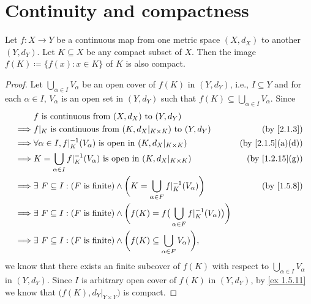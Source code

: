 \section{Continuity and compactness}\label{sec 2.3}

\begin{theorem}\label{2.3.1}
  Let \(f : X \to Y\) be a continuous map from one metric space \((X, d_X)\) to another \((Y, d_Y)\).
  Let \(K \subseteq X\) be any compact subset of \(X\).
  Then the image \(f(K) \coloneqq \{f(x) : x \in K\}\) of \(K\) is also compact.
\end{theorem}

\begin{proof}
  Let \(\bigcup_{\alpha \in I} V_\alpha\) be an open cover of \(f(K)\) in \((Y, d_Y)\), i.e., \(I \subseteq Y\) and for each \(\alpha \in I\), \(V_{\alpha}\) is an open set in \((Y, d_Y)\) such that \(f(K) \subseteq \bigcup_{\alpha \in I} V_\alpha\).
  Since
  \begin{align*}
             & f \text{ is continuous from } (X, d_X) \text{ to } (Y, d_Y)                                                                                                    \\
    \implies & f|_K \text{ is continuous from } (K, d_X|_{K \times K}) \text{ to } (Y, d_Y)                                                  & \text{(by \cref{2.1.3})}       \\
    \implies & \forall \alpha \in I, f|_K^{-1}(V_\alpha) \text{ is open in } (K, d_X|_{K \times K})                                          & \text{(by \cref{2.1.5}(a)(d))} \\
    \implies & K = \bigcup_{\alpha \in I} f|_K^{-1}(V_\alpha) \text{ is open in } (K, d_X|_{K \times K})                                     & \text{(by \cref{1.2.15}(g))}   \\
    \implies & \exists\ F \subseteq I : (F \text{ is finite}) \land \bigg(K = \bigcup_{\alpha \in F} f|_K^{-1}(V_\alpha)\bigg)               & \text{(by \cref{1.5.8})}       \\
    \implies & \exists\ F \subseteq I : (F \text{ is finite}) \land \bigg(f(K) = f\big(\bigcup_{\alpha \in F} f|_K^{-1}(V_\alpha)\big)\bigg)                                  \\
    \implies & \exists\ F \subseteq I : (F \text{ is finite}) \land \bigg(f(K) \subseteq \bigcup_{\alpha \in F} V_\alpha)\bigg),
  \end{align*}
  we know that there exists an finite subcover of \(f(K)\) with respect to \(\bigcup_{\alpha \in I} V_\alpha\) in \((Y, d_Y)\).
  Since \(I\) is arbitrary open cover of \(f(K)\) in \((Y, d_Y)\), by \cref{ex 1.5.11} we know that \(\big(f(K), d_Y|_{Y \times Y}\big)\) is compact.
\end{proof}

